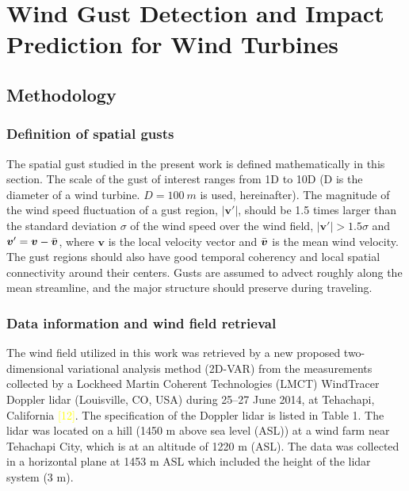 \chapter{Wind Gust Detection and Impact Prediction for Wind Turbines}

\section{Methodology}
\subsection{Definition of spatial gusts}
The spatial gust studied in the present work is defined mathematically in this section. The scale of the gust of interest ranges from 1D to 10D (D is the diameter of a wind turbine. $D=100~m$ is used, hereinafter). The magnitude of the wind speed fluctuation of a gust region, $|\boldsymbol{v}'|$, should be 1.5 times larger than the standard deviation $\sigma$ of the wind speed over the wind field, \ie$|\boldsymbol{v}'|>1.5\sigma$ and $\boldsymbol{v}'=\boldsymbol{v}-\Bar{\boldsymbol{v}}$, where $\boldsymbol{v}$ is the local velocity vector and $\Bar{\boldsymbol{v}}$ is the mean wind velocity. The gust regions should also have good temporal coherency and local spatial connectivity around their centers. Gusts are assumed to advect roughly along the mean streamline, and the major structure should preserve during traveling.

\subsection{Data information and wind field retrieval}
The wind field utilized in this work was retrieved by a new proposed two-dimensional variational analysis method (2D-VAR) from the measurements collected by a Lockheed Martin Coherent Technologies (LMCT) WindTracer\textsuperscript{\textregistered} Doppler lidar (Louisville, CO, USA) during 25–27 June 2014, at Tehachapi, California \textcolor{yellow}{[12]}. The specification of the Doppler lidar is listed in Table 1. The lidar was located on a hill (1450 m above sea level (ASL)) at a wind farm near Tehachapi City, which is at an altitude of 1220 m (ASL). The data was collected in a horizontal plane at 1453 m ASL which included the height of the lidar system (3 m).

